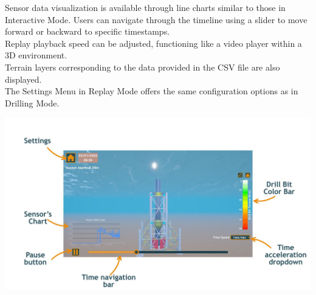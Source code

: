 \documentclass{article}
\begin{document}
Sensor data visualization is available through line charts similar to those in Interactive Mode. Users can navigate through the timeline using a slider to move forward or backward to specific timestamps.\\

Replay playback speed can be adjusted, functioning like a video player within a 3D environment.\\

Terrain layers corresponding to the data provided in the CSV file are also displayed.\\

The Settings Menu in Replay Mode offers the same configuration options as in Drilling Mode.
\begin{center}
    \includegraphics[width=6in]{ReplayMode.jpg}
\end{center}





\newpage
\end{document}
